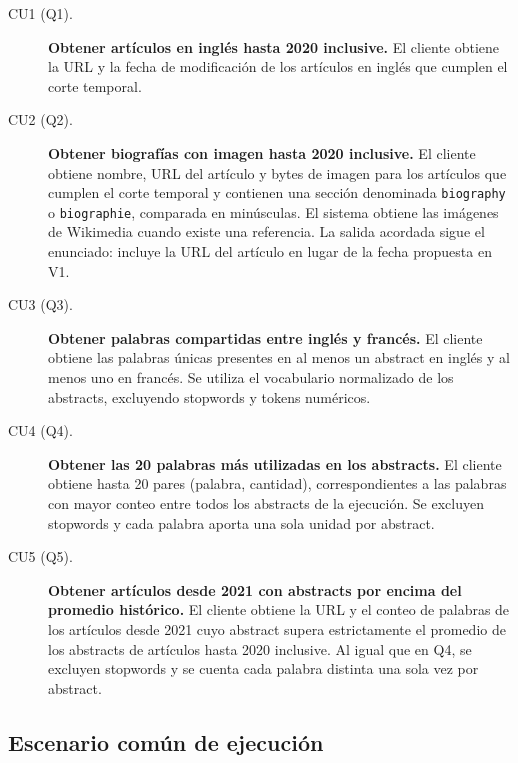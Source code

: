 \begin{description}
    \item[CU1 (Q1).] \textbf{Obtener artículos en inglés hasta 2020 inclusive.}
    El cliente obtiene la URL y la fecha de modificación de los artículos
    en inglés que cumplen el corte temporal.

    \item[CU2 (Q2).] \textbf{Obtener biografías con imagen hasta 2020 inclusive.}
    El cliente obtiene nombre, URL del artículo y bytes de imagen para los
    artículos que cumplen el corte temporal y contienen una sección denominada
    \texttt{biography} o \texttt{biographie}, comparada en minúsculas.
    El sistema obtiene las imágenes de Wikimedia cuando existe una referencia.
    La salida acordada sigue el enunciado: incluye la URL del artículo en lugar
    de la fecha propuesta en V1.

    \item[CU3 (Q3).] \textbf{Obtener palabras compartidas entre inglés y francés.}
    El cliente obtiene las palabras únicas presentes en al menos un abstract
    en inglés y al menos uno en francés. Se utiliza el vocabulario normalizado
    de los abstracts, excluyendo stopwords y tokens numéricos.

    \item[CU4 (Q4).] \textbf{Obtener las 20 palabras más utilizadas en los abstracts.}
    El cliente obtiene hasta 20 pares (palabra, cantidad), correspondientes
    a las palabras con mayor conteo entre todos los abstracts de la ejecución.
    Se excluyen stopwords y cada palabra aporta una sola unidad por abstract.

    \item[CU5 (Q5).] \textbf{Obtener artículos desde 2021 con abstracts por encima del
    promedio histórico.}
    El cliente obtiene la URL y el conteo de palabras de los artículos desde
    2021 cuyo abstract supera estrictamente el promedio de los abstracts de
    artículos hasta 2020 inclusive. Al igual que en Q4, se excluyen stopwords
    y se cuenta cada palabra distinta una sola vez por abstract.
\end{description}

\subsection{Escenario común de ejecución}
\label{subsec:escenario-comun}

